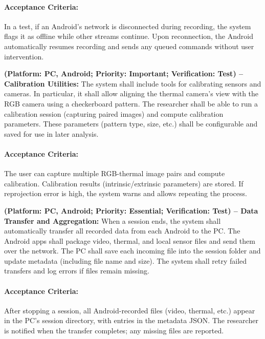\begin{description}[style=unboxed,leftmargin=0cm]
	      \paragraph{Acceptance Criteria:} In a test, if an Android’s network is disconnected during recording, the system flags it as offline while other streams continue. Upon reconnection, the Android automatically resumes recording and sends any queued commands without user intervention.

	\item[\textbf{FR9}] \textbf{(Platform: PC, Android; Priority: Important; Verification: Test) – Calibration Utilities:} The system shall include tools for calibrating sensors and cameras. In particular, it shall allow aligning the thermal camera’s view with the RGB camera using a checkerboard pattern. The researcher shall be able to run a calibration session (capturing paired images) and compute calibration parameters. These parameters (pattern type, size, etc.) shall be configurable and saved for use in later analysis.

	      \paragraph{Acceptance Criteria:} The user can capture multiple RGB-thermal image pairs and compute calibration. Calibration results (intrinsic/extrinsic parameters) are stored. If reprojection error is high, the system warns and allows repeating the process.

	\item[\textbf{FR10}] \textbf{(Platform: PC, Android; Priority: Essential; Verification: Test) – Data Transfer and Aggregation:} When a session ends, the system shall automatically transfer all recorded data from each Android to the PC. The Android apps shall package video, thermal, and local sensor files and send them over the network. The PC shall save each incoming file into the session folder and update metadata (including file name and size). The system shall retry failed transfers and log errors if files remain missing.

	      \paragraph{Acceptance Criteria:} After stopping a session, all Android-recorded files (video, thermal, etc.) appear in the PC’s session directory, with entries in the metadata JSON. The researcher is notified when the transfer completes; any missing files are reported.
\end{description}


